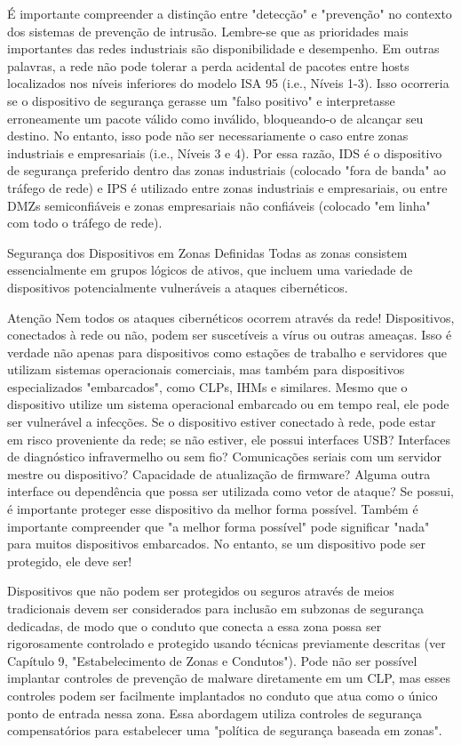 É importante compreender a distinção entre "detecção" e "prevenção" no contexto dos sistemas de prevenção de intrusão. Lembre-se que as prioridades mais importantes das redes industriais são disponibilidade e desempenho. Em outras palavras, a rede não pode tolerar a perda acidental de pacotes entre hosts localizados nos níveis inferiores do modelo ISA 95 (i.e., Níveis 1-3). Isso ocorreria se o dispositivo de segurança gerasse um "falso positivo" e interpretasse erroneamente um pacote válido como inválido, bloqueando-o de alcançar seu destino. No entanto, isso pode não ser necessariamente o caso entre zonas industriais e empresariais (i.e., Níveis 3 e 4). Por essa razão, IDS é o dispositivo de segurança preferido dentro das zonas industriais (colocado "fora de banda" ao tráfego de rede) e IPS é utilizado entre zonas industriais e empresariais, ou entre DMZs semiconfiáveis e zonas empresariais não confiáveis (colocado "em linha" com todo o tráfego de rede).

Segurança dos Dispositivos em Zonas Definidas
Todas as zonas consistem essencialmente em grupos lógicos de ativos, que incluem uma variedade de dispositivos potencialmente vulneráveis a ataques cibernéticos.

Atenção
Nem todos os ataques cibernéticos ocorrem através da rede! Dispositivos, conectados à rede ou não, podem ser suscetíveis a vírus ou outras ameaças. Isso é verdade não apenas para dispositivos como estações de trabalho e servidores que utilizam sistemas operacionais comerciais, mas também para dispositivos especializados "embarcados", como CLPs, IHMs e similares. Mesmo que o dispositivo utilize um sistema operacional embarcado ou em tempo real, ele pode ser vulnerável a infecções. Se o dispositivo estiver conectado à rede, pode estar em risco proveniente da rede; se não estiver, ele possui interfaces USB? Interfaces de diagnóstico infravermelho ou sem fio? Comunicações seriais com um servidor mestre ou dispositivo? Capacidade de atualização de firmware? Alguma outra interface ou dependência que possa ser utilizada como vetor de ataque? Se possui, é importante proteger esse dispositivo da melhor forma possível. Também é importante compreender que "a melhor forma possível" pode significar "nada" para muitos dispositivos embarcados. No entanto, se um dispositivo pode ser protegido, ele deve ser!

Dispositivos que não podem ser protegidos ou seguros através de meios tradicionais devem ser considerados para inclusão em subzonas de segurança dedicadas, de modo que o conduto que conecta a essa zona possa ser rigorosamente controlado e protegido usando técnicas previamente descritas (ver Capítulo 9, "Estabelecimento de Zonas e Condutos"). Pode não ser possível implantar controles de prevenção de malware diretamente em um CLP, mas esses controles podem ser facilmente implantados no conduto que atua como o único ponto de entrada nessa zona. Essa abordagem utiliza controles de segurança compensatórios para estabelecer uma "política de segurança baseada em zonas".

